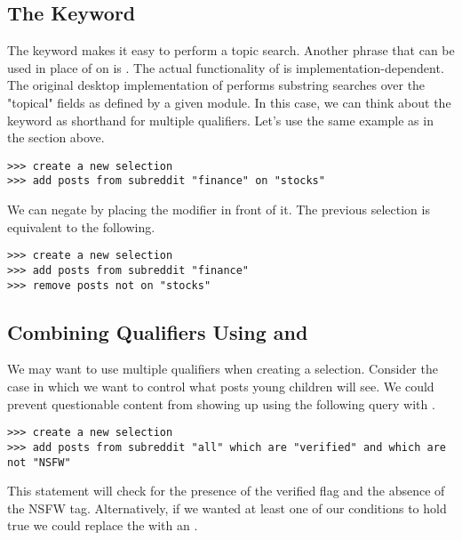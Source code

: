 \subsection{The  Keyword}
The  keyword makes it easy to perform a topic search. Another phrase that can be used in place of on is . The actual functionality of  is implementation-dependent. The original desktop implementation of  performs substring searches over the "topical" fields as defined by a given module. In this case, we can think about the keyword  as shorthand for multiple  qualifiers. Let’s use the same example as in the   section above.
\newline\begin{minipage}{\linewidth}\begin{lstlisting}
>>> create a new selection
>>> add posts from subreddit "finance" on "stocks"
\end{lstlisting}\end{minipage}
We can negate  by placing the  modifier in front of it. The previous selection is equivalent to the following.
\newline\begin{minipage}{\linewidth}\begin{lstlisting}
>>> create a new selection
>>> add posts from subreddit "finance"
>>> remove posts not on "stocks"
\end{lstlisting}\end{minipage}
\subsection{Combining Qualifiers Using  and }
We may want to use multiple qualifiers when creating a selection. Consider the case in which we want to control what posts young children will see. We could prevent questionable content from showing up using the following query with .
\newline\begin{minipage}{\linewidth}\begin{lstlisting}
>>> create a new selection
>>> add posts from subreddit "all" which are "verified" and which are not "NSFW"
\end{lstlisting}\end{minipage}
This statement will check for the presence of the verified flag and the absence of the NSFW tag. Alternatively, if we wanted at least one of our conditions to hold true we could replace the  with an .

